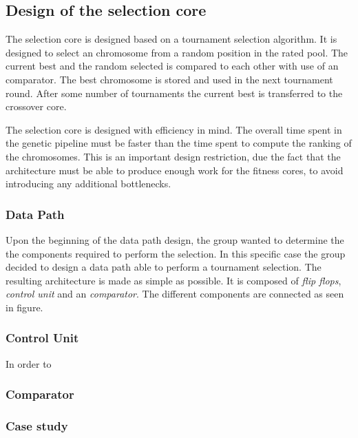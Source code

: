 \subsection {Design of the selection core} \label{fpga:selection:ss:selection_core}


The selection core is designed based on a tournament selection algorithm. It is designed to select an chromosome from a random position in the rated pool. The current best and the random selected is compared to each other with use of an comparator. The best chromosome is stored and used in the next tournament round. After some number of tournaments the current best is transferred to the crossover core. 


The selection core is designed with efficiency in mind.
The overall time spent in the genetic pipeline must be faster than the time spent to compute the ranking of the chromosomes. This is an important design restriction, due the fact that the architecture must be able to produce enough work for the fitness cores, to avoid introducing any additional bottlenecks.


\subsubsection{Data Path}
Upon the beginning of the data path design, the group wanted to determine the the components required to perform the selection. In this specific case the group decided to design a data path able to perform a tournament selection. The resulting architecture is made as simple as possible.  It is composed of \emph{flip flops}, \emph{control unit} and an \emph{comparator}. The different components are connected as seen in figure.






\subsubsection{Control Unit} \label{fpga:selection:sss:control_unit}
In order to 


\subsubsection {Comparator} \label{fpga:selection:sss:comparator}



\subsubsection{Case study} \label{fpga:selection:sss:case_study}



